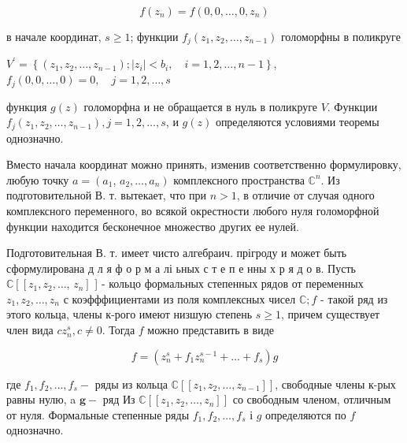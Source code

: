 \documentclass[10pt]{article}
\begin{document}
\[

f\left(z_{n}\right)=f\left(0,0, \ldots, 0, z_{n}\right)

\]



в начале координат, $s \geqslant 1$; функции $f_{j}\left(z_{1}, z_{2}, \ldots, z_{n-1}\right)$ голоморфны в поликруге



$V^{\prime}=\left\{\left(z_{1}, z_{2}, \ldots, z_{n-1}\right) ;\left|z_{i}\right|<b_{i}, \quad i=1,2, \ldots, n-1\right\}$, $f_{j}(0,0, \ldots, 0)=0, \quad j=1,2, \ldots, s$



функция $g(z)$ голоморфна и не обращается в нуль в поликруге $V$. Функции $f_{j}\left(z_{1}, z_{2}, \ldots, z_{n-1}\right), j=1,2, \ldots, s$, и $g(z)$ определяются условиями теоремы однозначно.



Вместо начала координат можно принять, изменив соответственно формулировку, любую точку $a=\left(a_{1}\right.$, $\left.a_{2}, \ldots, a_{n}\right)$ комплексного пространства $\mathbb{C}^{n}$. Из подготовительной В. т. вытекает, что при $n>1$, в отличие от случая одного комплексного переменного, во всякой окрестности любого нуля голоморфной функции находится бесконечное множество других ее нулей.



Подготовительная В. т. имеет чисто алгебраич. прігроду и может быть сформулирована д л я ф о р м а лі ьных с т е п е нны х р я д о в. Пусть $\mathbb{C}\left[\left[z_{1}, z_{2}, \ldots\right.\right.$, $\left.z_{n}\right]$ ] - кольцо формальных степенных рядов от переменных $z_{1}, z_{2}, \ldots, z_{n}$ с коэфффициентами из поля комплексных чисел $\mathbb{C} ; f$ - такой ряд из этого кольца, члены к-рого имеют низшую степень $s \geqslant 1$, причем существует член вида $c z_{n}^{s}, c \neq 0$. Тогда $f$ можно представить в виде



\[

f=\left(z_{n}^{s}+f_{1} z_{n}^{s-1}+\ldots+f_{s}\right) g

\]



где $f_{1}, f_{2}, \ldots, f_{s}-$ ряды из кольца $\mathbb{C}\left[\left[z_{1}, z_{2}, \ldots, z_{n-1}\right]\right]$, свободные члены к-рых равны нулю, a $\boldsymbol{g}-$ ряд Из $\mathbb{C}\left[\left[z_{1}, z_{2}, \ldots, z_{n}\right]\right]$ со свободным членом, отличным от нуля. Формальные степенные ряды $f_{1}, f_{2}, \ldots, f_{s}$ і $g$ определяются по $f$ однозначно.
\end{document}
